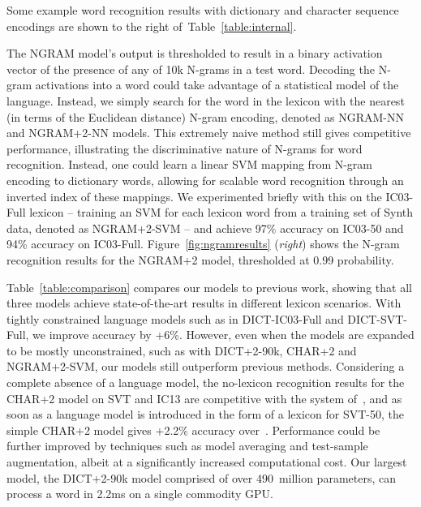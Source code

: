\documentclass{article} \usepackage{nips14submit_e,times}
\newcommand{\tblref}[1]{Table~\ref{#1}}
\renewcommand{\paragraph}[1]{\par\noindent{\bf #1}}
\begin{document}
Some example word recognition results with dictionary and character sequence encodings are shown to the right of~\tblref{table:internal}.

\paragraph{Bag-of-N-grams Encoding.}
The NGRAM model's output is thresholded to result in a binary activation vector of the presence of any of 10k N-grams in a test word.
Decoding the N-gram activations into a word could take advantage of a statistical model of the language. Instead, 
we simply search for the word in the lexicon with the nearest (in terms of the Euclidean distance) N-gram encoding, denoted as NGRAM-NN and NGRAM+2-NN models. This extremely naive method still gives competitive performance, illustrating the discriminative nature of N-grams for word recognition. Instead, one could learn a linear SVM mapping from N-gram encoding to dictionary words, allowing for scalable word recognition through an inverted index of these mappings. We experimented briefly with this on the IC03-Full lexicon -- training an SVM for each lexicon word from a training set of Synth data, denoted as NGRAM+2-SVM -- and achieve 97\% accuracy on IC03-50 and 94\% accuracy on IC03-Full. Figure~\ref{fig:ngramresults} (\emph{right}) shows the N-gram recognition results for the NGRAM+2 model, thresholded at 0.99 probability.

\paragraph{Comparison \& Discussion.}
\tblref{table:comparison} compares our models to previous work, showing that all three models achieve state-of-the-art results in different lexicon scenarios. 
With tightly constrained language models such as in DICT-IC03-Full and DICT-SVT-Full, we improve accuracy by +6\%. 
However, even when the models are expanded to be mostly unconstrained, such as with DICT+2-90k, CHAR+2 and NGRAM+2-SVM, our models still outperform previous methods. Considering a complete absence of a language model, the no-lexicon recognition results for the CHAR+2 model on SVT and IC13 are competitive with the system of~\cite{Bissacco13}, and as soon as a language model is introduced in the form of a lexicon for SVT-50, the simple CHAR+2 model gives +2.2\% accuracy over~\cite{Bissacco13}.
Performance could be further improved by techniques such as model averaging and test-sample augmentation, albeit at a significantly increased computational cost. Our largest model, the DICT+2-90k model comprised of over 490~million parameters, can process a word in 2.2ms on a single commodity GPU.
\end{document}
